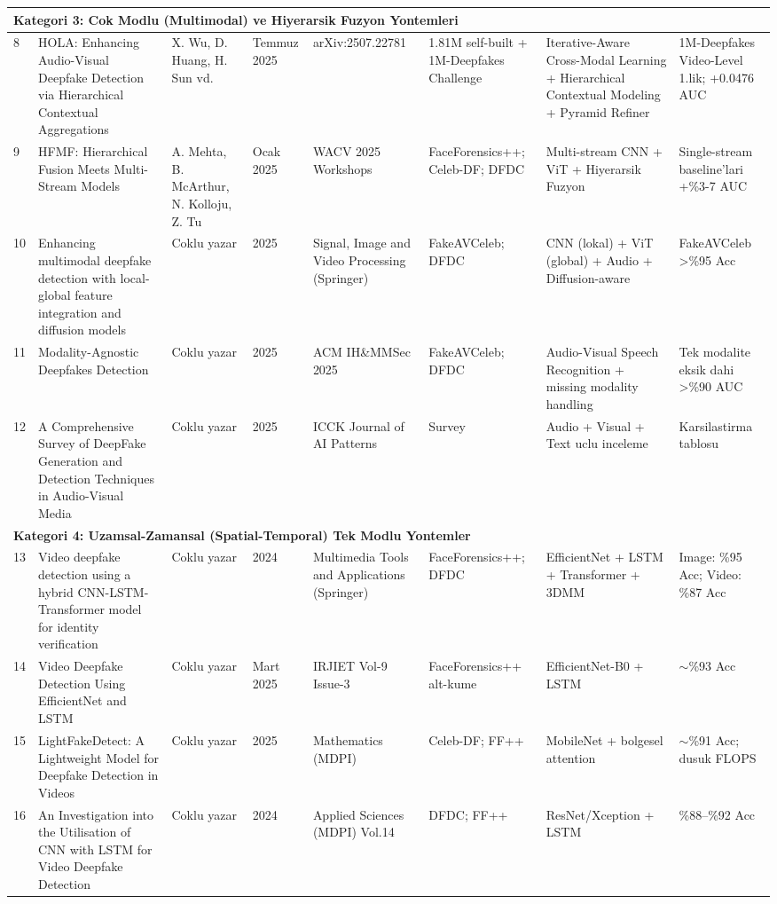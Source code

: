 \begin{landscape}
\begin{longtable}{@{}p{0.5cm} p{4.2cm} p{3.0cm} p{1.6cm} p{3.0cm} p{3.0cm} p{4.2cm} p{3.5cm}@{}}
\multicolumn{8}{l}{\textbf{Kategori 3: Cok Modlu (Multimodal) ve Hiyerarsik Fuzyon Yontemleri}} \\
\midrule
8 & HOLA: Enhancing Audio-Visual Deepfake Detection via Hierarchical Contextual Aggregations & X. Wu, D. Huang, H. Sun vd. & Temmuz 2025 & arXiv:2507.22781 & 1.81M self-built + 1M-Deepfakes Challenge & Iterative-Aware Cross-Modal Learning + Hierarchical Contextual Modeling + Pyramid Refiner & 1M-Deepfakes Video-Level 1.lik; +0.0476 AUC \\
\midrule
9 & HFMF: Hierarchical Fusion Meets Multi-Stream Models & A. Mehta, B. McArthur, N. Kolloju, Z. Tu & Ocak 2025 & WACV 2025 Workshops & FaceForensics++; Celeb-DF; DFDC & Multi-stream CNN + ViT + Hiyerarsik Fuzyon & Single-stream baseline'lari +\%3-7 AUC \\
\midrule
10 & Enhancing multimodal deepfake detection with local-global feature integration and diffusion models & Coklu yazar & 2025 & Signal, Image and Video Processing (Springer) & FakeAVCeleb; DFDC & CNN (lokal) + ViT (global) + Audio + Diffusion-aware & FakeAVCeleb \textgreater \%95 Acc \\
\midrule
11 & Modality-Agnostic Deepfakes Detection & Coklu yazar & 2025 & ACM IH\&MMSec 2025 & FakeAVCeleb; DFDC & Audio-Visual Speech Recognition + missing modality handling & Tek modalite eksik dahi \textgreater \%90 AUC \\
\midrule
12 & A Comprehensive Survey of DeepFake Generation and Detection Techniques in Audio-Visual Media & Coklu yazar & 2025 & ICCK Journal of AI Patterns & Survey & Audio + Visual + Text uclu inceleme & Karsilastirma tablosu \\
\midrule

\multicolumn{8}{l}{\textbf{Kategori 4: Uzamsal-Zamansal (Spatial-Temporal) Tek Modlu Yontemler}} \\
\midrule
13 & Video deepfake detection using a hybrid CNN-LSTM-Transformer model for identity verification & Coklu yazar & 2024 & Multimedia Tools and Applications (Springer) & FaceForensics++; DFDC & EfficientNet + LSTM + Transformer + 3DMM & Image: \%95 Acc; Video: \%87 Acc \\
\midrule
14 & Video Deepfake Detection Using EfficientNet and LSTM & Coklu yazar & Mart 2025 & IRJIET Vol-9 Issue-3 & FaceForensics++ alt-kume & EfficientNet-B0 + LSTM & $\sim$\%93 Acc \\
\midrule
15 & LightFakeDetect: A Lightweight Model for Deepfake Detection in Videos & Coklu yazar & 2025 & Mathematics (MDPI) & Celeb-DF; FF++ & MobileNet + bolgesel attention & $\sim$\%91 Acc; dusuk FLOPS \\
\midrule
16 & An Investigation into the Utilisation of CNN with LSTM for Video Deepfake Detection & Coklu yazar & 2024 & Applied Sciences (MDPI) Vol.14 & DFDC; FF++ & ResNet/Xception + LSTM & \%88--\%92 Acc \\
\midrule


\end{longtable}
\end{landscape}
